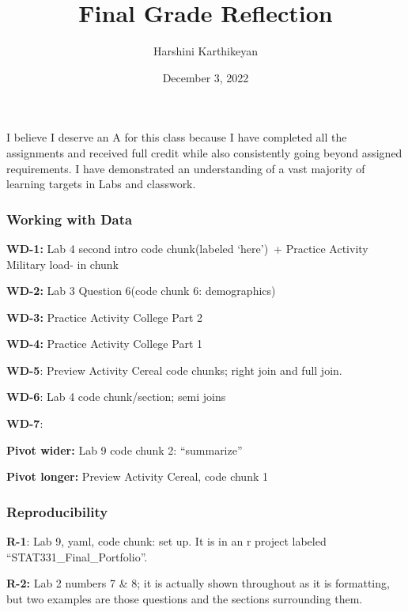 \documentclass[
  letterpaper,
  DIV=11,
  numbers=noendperiod]{scrartcl}
\title{Final Grade Reflection}
\author{Harshini Karthikeyan}
\date{December 3, 2022}
\begin{document}
\maketitle
\ifdefined\Shaded\renewenvironment{Shaded}{\begin{tcolorbox}[frame hidden, interior hidden, breakable, borderline west={3pt}{0pt}{shadecolor}, enhanced, sharp corners, boxrule=0pt]}{\end{tcolorbox}}\fi

I believe I deserve an A for this class because I have completed all the
assignments and received full credit while also consistently going
beyond assigned requirements. I have demonstrated an understanding of a
vast majority of learning targets in Labs and classwork.~

\hypertarget{working-with-data}{%
\subsubsection{Working with Data}\label{working-with-data}}

\textbf{WD-1:} Lab 4 second intro code chunk(labeled `here')~+ Practice
Activity Military load- in chunk

\textbf{WD-2:} Lab 3 Question 6(code chunk 6: demographics)

\textbf{WD-3:} Practice Activity College Part 2

\textbf{WD-4:} Practice Activity College Part 1~

\textbf{WD-5}: Preview Activity Cereal code chunks; right join and full
join.~

\textbf{WD-6}: Lab 4 code chunk/section; semi joins

\textbf{WD-7}:~

\textbf{Pivot wider:} Lab 9 code chunk 2: ``summarize''

\textbf{Pivot longer:} Preview Activity Cereal, code chunk 1

\hypertarget{reproducibility}{%
\subsubsection{Reproducibility}\label{reproducibility}}

\textbf{R-1}: Lab 9, yaml, code chunk: set up. It is in an r project
labeled ``STAT331\_Final\_Portfolio''.

\textbf{R-2:} Lab 2 numbers 7 \& 8; it is actually shown throughout as
it is formatting, but two examples are those questions and the sections
surrounding them.~
\end{document}
